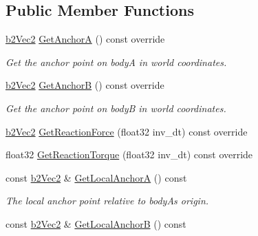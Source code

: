 \subsection*{Public Member Functions}
\begin{DoxyCompactItemize}
\item 
\mbox{\label{classb2_distance_joint_ae228d3ce27009acd8a20c2570fb1183c}} 
\hyperlink{structb2_vec2}{b2\+Vec2} \hyperlink{classb2_distance_joint_ae228d3ce27009acd8a20c2570fb1183c}{Get\+AnchorA} () const override
\begin{DoxyCompactList}\small\item\em Get the anchor point on bodyA in world coordinates. \end{DoxyCompactList}\item 
\mbox{\label{classb2_distance_joint_a05bf71de10904c87e3a5295aa04a8aa6}} 
\hyperlink{structb2_vec2}{b2\+Vec2} \hyperlink{classb2_distance_joint_a05bf71de10904c87e3a5295aa04a8aa6}{Get\+AnchorB} () const override
\begin{DoxyCompactList}\small\item\em Get the anchor point on bodyB in world coordinates. \end{DoxyCompactList}\item 
\hyperlink{structb2_vec2}{b2\+Vec2} \hyperlink{classb2_distance_joint_a6aa951e5bbfcae8a617987955cadbed5}{Get\+Reaction\+Force} (float32 inv\+\_\+dt) const override
\item 
float32 \hyperlink{classb2_distance_joint_ad7ac78c4c20c122b944947d523a02982}{Get\+Reaction\+Torque} (float32 inv\+\_\+dt) const override
\item 
\mbox{\label{classb2_distance_joint_aaa881128071c62f21898a75d5b20308a}} 
const \hyperlink{structb2_vec2}{b2\+Vec2} \& \hyperlink{classb2_distance_joint_aaa881128071c62f21898a75d5b20308a}{Get\+Local\+AnchorA} () const
\begin{DoxyCompactList}\small\item\em The local anchor point relative to bodyA\textquotesingle{}s origin. \end{DoxyCompactList}\item 
\mbox{\label{classb2_distance_joint_a214a1cca8854613d7401c9a5892a28c9}} 
const \hyperlink{structb2_vec2}{b2\+Vec2} \& \hyperlink{classb2_distance_joint_a214a1cca8854613d7401c9a5892a28c9}{Get\+Local\+AnchorB} () const

\end{DoxyCompactItemize}
